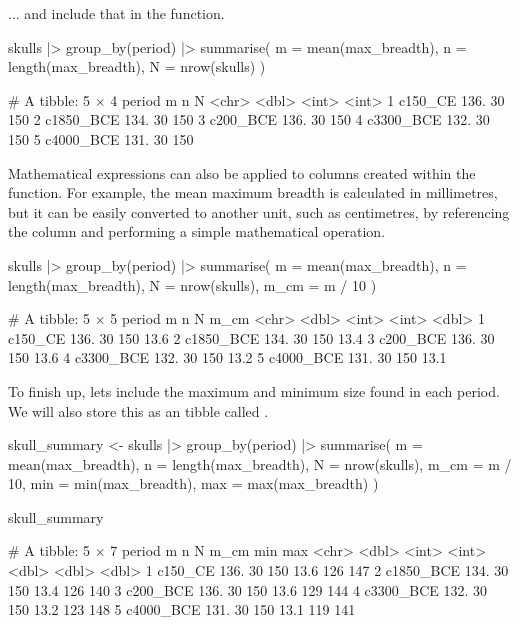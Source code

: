 \noindent
... and include that in the  function.

\begin{inR}
skulls |> 
  group_by(period) |> 
  summarise(
    m = mean(max_breadth),
    n = length(max_breadth),
    N = nrow(skulls)
    )
\end{inR}
\begin{outR}
# A tibble: 5 × 4
  period        m     n     N
  <chr>     <dbl> <int> <int>
1 c150_CE    136.    30   150
2 c1850_BCE  134.    30   150
3 c200_BCE   136.    30   150
4 c3300_BCE  132.    30   150
5 c4000_BCE  131.    30   150
\end{outR}

Mathematical expressions can also be applied to columns created within the  function. For example, the mean maximum breadth is calculated in millimetres, but it can be easily converted to another unit, such as centimetres, by referencing the column and performing a simple mathematical operation.

\begin{inR}
skulls |> 
  group_by(period) |> 
  summarise(
    m = mean(max_breadth),
    n = length(max_breadth),
    N = nrow(skulls),
    m_cm = m / 10
    )
\end{inR}

\begin{outR}
# A tibble: 5 × 5
  period        m     n     N  m_cm
  <chr>     <dbl> <int> <int> <dbl>
1 c150_CE    136.    30   150  13.6
2 c1850_BCE  134.    30   150  13.4
3 c200_BCE   136.    30   150  13.6
4 c3300_BCE  132.    30   150  13.2
5 c4000_BCE  131.    30   150  13.1
\end{outR}


To finish up, lets include the maximum and minimum size found in each period. We will also store this as an tibble called .

\begin{inR}
skull_summary <- skulls |>
  group_by(period) |>
  summarise(
    m = mean(max_breadth),
    n = length(max_breadth),
    N = nrow(skulls),
    m_cm = m / 10,
    min = min(max_breadth),
    max = max(max_breadth)
  )\textbf{}

skull_summary
\end{inR}

\begin{outR}
# A tibble: 5 × 7
  period        m     n     N  m_cm   min   max
  <chr>     <dbl> <int> <int> <dbl> <dbl> <dbl>
1 c150_CE    136.    30   150  13.6   126   147
2 c1850_BCE  134.    30   150  13.4   126   140
3 c200_BCE   136.    30   150  13.6   129   144
4 c3300_BCE  132.    30   150  13.2   123   148
5 c4000_BCE  131.    30   150  13.1   119   141
\end{outR}

